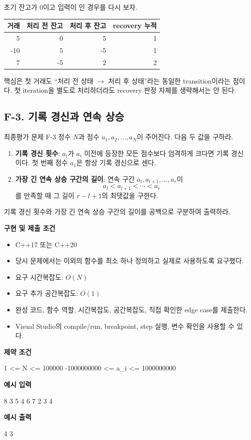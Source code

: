 초기 잔고가 0이고 입력이 인 경우를 다시 보자.
\begin{center}
\begin{tabular}{rrrr}
\toprule
거래 & 처리 전 잔고 & 처리 후 잔고 & recovery 누적 \\
\midrule
5 & 0 & 5 & 1 \\
-10 & 5 & -5 & 1 \\
7 & -5 & 2 & 2 \\
\bottomrule
\end{tabular}
\end{center}

핵심은 첫 거래도 ``처리 전 상태 $\rightarrow$ 처리 후 상태''라는 동일한 transition이라는 점이다. 첫 iteration을 별도로 처리하더라도 recovery 판정 자체를 생략해서는 안 된다.

\subsection{F-3. 기록 경신과 연속 상승}
\begin{problembox}{최종평가 문제 F-3}
정수 $N$과 점수 $a_1,a_2,\dots,a_N$이 주어진다. 다음 두 값을 구하라.

\begin{enumerate}
  \item \textbf{기록 경신 횟수}: $a_i$가 $a_i$ 이전에 등장한 모든 점수보다 엄격하게 크다면 기록 경신이다. 첫 번째 점수 $a_1$은 항상 기록 경신으로 센다.
  \item \textbf{가장 긴 연속 상승 구간의 길이}: 연속 구간 $a_l,a_{l+1},\dots,a_r$이
  \[
  a_l<a_{l+1}<\cdots<a_r
  \]
  를 만족할 때 그 길이 $r-l+1$의 최댓값을 구한다.
\end{enumerate}

기록 경신 횟수와 가장 긴 연속 상승 구간의 길이를 공백으로 구분하여 출력하라.

\textbf{구현 및 제출 조건}
\begin{itemize}
  \item C++17 또는 C++20
  \item 당시 문제에서는  이외의 함수를 최소 하나 정의하고 실제로 사용하도록 요구했다.
  \item 요구 시간복잡도: $O(N)$
  \item 요구 추가 공간복잡도: $O(1)$
  \item 완성 코드, 함수 역할, 시간복잡도, 공간복잡도, 직접 확인한 edge case를 제출한다.
  \item Visual Studio의 compile/run, breakpoint, step 실행, 변수 확인을 사용할 수 있다.
\end{itemize}

\textbf{제약 조건}
\begin{TextBlock}
1 <= N <= 100000
-1000000000 <= a_i <= 1000000000
\end{TextBlock}

\textbf{예시 입력}
\begin{TextBlock}
8
3 5 4 6 7 2 3 4
\end{TextBlock}

\textbf{예시 출력}
\begin{TextBlock}
4 3
\end{TextBlock}
\end{problembox}


